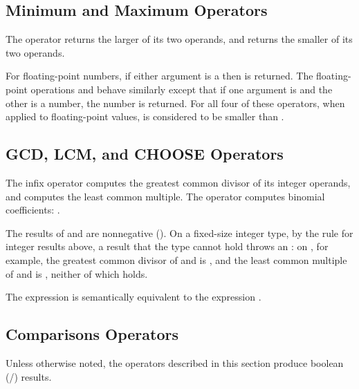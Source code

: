 \subsection{Minimum and Maximum Operators}

The operator  returns the larger of its two operands,
and  returns the smaller of its two operands.

For floating-point numbers, if either argument is a  then
 is returned.  The floating-point operations  and
behave similarly except that if one argument is  and the
other is a number, the number is returned.  For all four of these
operators, when applied to floating-point values,
 is considered to be smaller than .

\subsection{GCD, LCM, and CHOOSE Operators}

The infix operator  computes the greatest common
divisor of its integer operands, and  computes the least
common multiple.  The operator  computes binomial
coefficients:
.

The results of  and  are nonnegative
().
On a fixed-size integer type, by the rule for integer results above, a result that the type
cannot hold throws an : on , for example,
the greatest common divisor of  and  is , and
the least common multiple of  and  is ,
neither of which  holds.

The expression  is semantically equivalent to the expression
.


\subsection{Comparisons Operators}

Unless otherwise noted, the operators described in this section
produce boolean (/) results.

